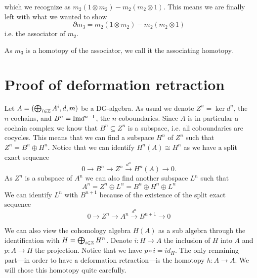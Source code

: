 which we recognize as $m_2(1\otimes m_2) - m_2(m_2\otimes 1)$. This means we are finally left with what we wanted to show 
\begin{equation*}
    \partial m_3 = m_2(1\otimes m_2)-m_2(m_2\otimes 1)
\end{equation*}
i.e. the associator of $m_2$. 

As $m_3$ is a homotopy of the associator, we call it the associating homotopy.


\section*{Proof of deformation retraction}

Let $A=(\bigoplus_{i\in \mathbb{Z}}A^i, d, m)$ be a DG-algebra. As usual we denote $Z^n = \ker d^n$, the $n$-cochains,  and $B^n = \text{Im} d^{n-1}$, the $n$-coboundaries. Since $A$ is in particular a cochain complex we know that $B^n\subseteq Z^n$ is a subspace, i.e. all coboundaries are cocycles. This means that we can find a subspace $H^n$ of $Z^n$ such that $Z^n = B^n\oplus H^n$. Notice that we can identify $H^n(A)\cong H^n$ as we have a split exact sequence
\begin{equation*}
    0\longrightarrow B^n\longrightarrow Z^n\overset{d^n}\longrightarrow H^n(A)\longrightarrow 0 .
\end{equation*}
As $Z^n$ is a subspace of $A^n$ we can also find another subspace $L^n$ such that 
\begin{equation*}
    A^n = Z^n\oplus L^n = B^n\oplus H^n\oplus L^n
\end{equation*}
We can identify $L^n$ with $B^{n+1}$ because of the existence of the split exact sequence 
\begin{equation*}
    0\longrightarrow Z^n\longrightarrow A^n\overset{d^n}\longrightarrow B^{n+1}\longrightarrow 0
\end{equation*}

We can also view the cohomology algebra $H(A)$ as a sub algebra through the identification with $H=\bigoplus_{i\in \mathbb{Z}} H^n$. Denote $i\colon H\longrightarrow A$ the inclusion of $H$ into $A$ and $p\colon A\longrightarrow H$ the projection. Notice that we have $p\circ i = id_H$. The only remaining part---in order to have a deformation retraction---is the homotopy $h\colon A\longrightarrow A$. We will chose this homotopy quite carefully. 

